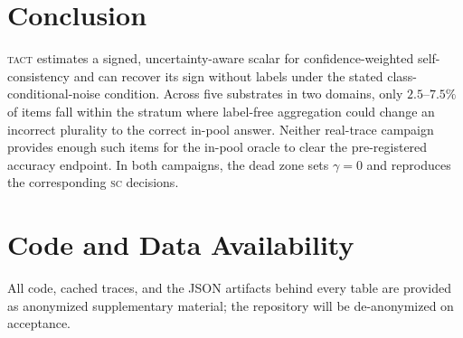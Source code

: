 \documentclass{article}
\newcommand{\SC}{\textsc{sc}}
\newcommand{\TACT}{\textsc{tact}}
\begin{document}
\section{Conclusion}
\TACT{} estimates a signed, uncertainty-aware scalar for confidence-weighted
self-consistency and can recover its sign without labels under the stated
class-conditional-noise condition. Across five substrates in two domains, only
$2.5$--$7.5\%$ of items fall within the stratum where label-free aggregation
could change an incorrect plurality to the correct in-pool answer. Neither
real-trace campaign provides enough such items for the in-pool oracle to clear
the pre-registered accuracy endpoint. In both campaigns, the dead zone sets
$\gamma=0$ and reproduces the corresponding \SC{} decisions.

\section*{Code and Data Availability}
All code, cached traces, and the JSON artifacts behind every table are
provided as anonymized supplementary material; the repository will be
de-anonymized on acceptance.

\appendix
\end{document}
